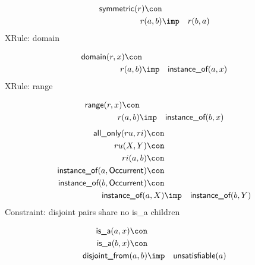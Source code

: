 \begin{eqnarray*}
 \pr{symmetric}(r) \con \\
r(a, b) &\imp &r(b, a) 
\end{eqnarray*}
XRule: domain

\begin{eqnarray*}
 \pr{domain}(r, x) \con \\
r(a, b) &\imp & \pr{instance\_of}(a, x) 
\end{eqnarray*}
XRule: range

\begin{eqnarray*}
 \pr{range}(r, x) \con \\
r(a, b) &\imp & \pr{instance\_of}(b, x) 
\end{eqnarray*}
\begin{eqnarray*}
 \pr{all\_only}(ru, ri) \con \\
ru(X, Y) \con \\
ri(a, b) \con \\
 \pr{instance\_of}(a,  \pr{Occurrent}) \con \\
 \pr{instance\_of}(b,  \pr{Occurrent}) \con \\
 \pr{instance\_of}(a, X) &\imp & \pr{instance\_of}(b, Y) 
\end{eqnarray*}
Constraint: disjoint pairs share no is\_a children

\begin{eqnarray*}
 \pr{is\_a}(a, x) \con \\
 \pr{is\_a}(b, x) \con \\
 \pr{disjoint\_from}(a, b) &\imp & \pr{unsatisfiable}(a) 
\end{eqnarray*}
